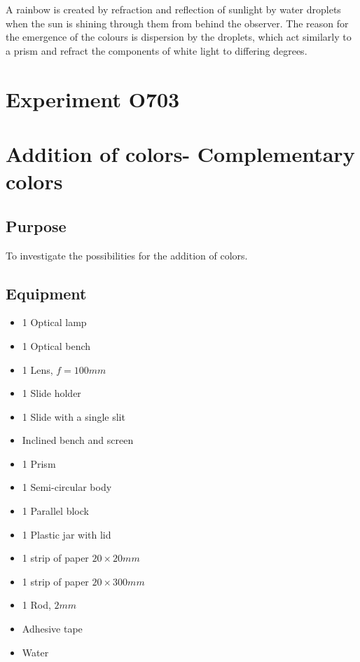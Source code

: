 \documentclass[12pt]{article}
\begin{document}
A rainbow is created by refraction and reflection of sunlight by water droplets when the sun is
shining through them from behind the observer. The reason for the emergence of the colours is
dispersion by the droplets, which act similarly to a prism and refract the components of white
light to differing degrees.

\newpage

\section*{Experiment O703}

\section*{Addition of colors- Complementary colors}

\subsection*{Purpose}

To investigate the possibilities for the addition of colors.

\subsection*{Equipment}

\begin{itemize}
\item 1 Optical lamp
\item 1 Optical bench
\item 1 Lens, $f=100 mm$
\item 1 Slide holder
\item 1 Slide with a single slit
\item Inclined bench and screen
\item 1 Prism
\item 1 Semi-circular body
\item 1 Parallel block
\item 1 Plastic jar with lid
\item 1 strip of paper $20\times20 mm$
\item 1 strip of paper $20 \times 300 mm$
\item 1 Rod, $2mm$
\item Adhesive tape
\item Water
\end{itemize}
\end{document}
